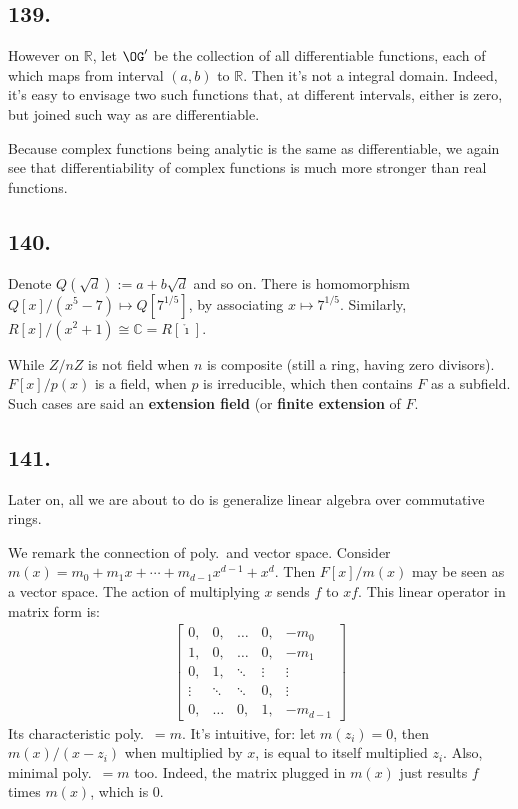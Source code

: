 \documentclass[12pt]{article}
\newcommand\R\sqrt%
\newcommand\Mp\mapsto%
\newcommand{\ii}{ \mathring{\imath} }%
\newcommand{\BF}[1]{ \mathbb{#1} }%
\newcommand{\Ss}[1]{\textsf{\bfseries{#1}}}%
\begin{document}
\subsection*{139.} However on \(\BF R\), let \(\OG'\) be the collection of all differentiable functions, each of which maps from interval \((a,b)\) to \(\BF R\). 
Then it's not a integral domain. 
Indeed, it's easy to envisage two such functions that, at different intervals, either is zero, but joined such way as are differentiable. \par
Because complex functions being analytic is the same as differentiable, 
we again see that differentiability of complex functions is much more stronger than real functions. 

\subsection*{140.} Denote \(Q(\R{d}) := { a + b \R{d} }\) and so on. 
There is homomorphism \(Q[x]/(x^5-7) \Mp Q[7^{1/5}]\), 
by associating \(x \Mp 7^{1/5}\). 
Similarly, \(R[x]/(x^2+1) \cong \BF C = R[\ii]\). \par
While \(Z/nZ\) is not field when \(n\) is composite (still a ring, having zero divisors). 
\(F[x]/p(x)\) is a field, when \(p\) is irreducible, which then contains \(F\) as a subfield. 
Such cases are said an \Ss{extension field} (or \Ss{finite extension} of \(F\). 

\subsection*{141.} Later on, all we are about to do is generalize linear algebra over commutative rings. \par
We remark the connection of poly.\ and vector space. Consider  \(m(x) = m_0 + m_1 x +\dotsb+ m_{d-1} x^{d-1} + x^{d}\). 
Then \(F[x]/m(x)\) may be seen as a vector space. 
The action of multiplying \(x\) sends \(f\) to \(xf\). 
This linear operator in matrix form is: \begin{gather}
 \begin{bmatrix}
  0, &0, &\dots &0, &-m_0 \\
  1, &0, &\dots &0, &-m_1 \\
  0, &1, &\ddots &\vdots &\vdots \\
  \vdots &\ddots &\ddots &0, &\vdots \\
  0, &\dots &0, &1, &-m_{d-1}
 \end{bmatrix}
\end{gather} Its characteristic poly.\ \(= m\). 
It's intuitive, for: let \(m(z_i)=0\), then \(m(x)/(x-z_i)\) when multiplied by \(x\), is equal to itself multiplied \(z_i\). 
Also, minimal poly.\ \(= m\) too. 
Indeed, the matrix plugged in \(m(x)\) just results \(f\) times \(m(x)\), which is 0. 
\end{document}
